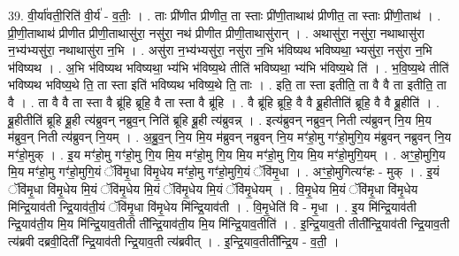 \documentclass[17pt]{extarticle}
\begin{document}
39. वी॒र्या॑वती॒रिति॑ वी॒र्य॑ - व॒तीः॒ । . ताः प्री॑णीत प्रीणीत॒ ता स्ताः प्री॑णी॒ताथाथ॑ प्रीणीत॒ ता स्ताः प्री॑णी॒ताथ॑ । . प्री॒णी॒ताथाथ॑ प्रीणीत प्रीणी॒ताथासु॑रा॒ नसु॑रा॒ नथ॑ प्रीणीत प्रीणी॒ताथासु॑रान् । . अथासु॑रा॒ नसु॑रा॒ नथाथासु॑रा न॒भ्य॑भ्यसु॑रा॒ नथाथासु॑रा न॒भि । . असु॑रा न॒भ्य॑भ्यसु॑रा॒ नसु॑रा न॒भि भ॑विष्यथ भविष्यथा॒ भ्यसु॑रा॒ नसु॑रा न॒भि भ॑विष्यथ । . अ॒भि भ॑विष्यथ भविष्यथा॒ भ्य॑भि भ॑विष्य॒थे तीति॑ भविष्यथा॒ भ्य॑भि भ॑विष्य॒थे ति॑ । . भ॒वि॒ष्य॒थे तीति॑ भविष्यथ भविष्य॒थे ति॒ ता स्ता इति॑ भविष्यथ भविष्य॒थे ति॒ ताः । . इति॒ ता स्ता इतीति॒ ता वै वै ता इतीति॒ ता वै । . ता वै वै ता स्ता वै ब्रू॑हि ब्रूहि॒ वै ता स्ता वै ब्रू॑हि । . वै ब्रू॑हि ब्रूहि॒ वै वै ब्रू॒हीतीति॑ ब्रूहि॒ वै वै ब्रू॒हीति॑ । . ब्रू॒हीतीति॑ ब्रूहि ब्रू॒ही त्य॑ब्रुवन् नब्रुव॒न् निति॑ ब्रूहि ब्रू॒ही त्य॑ब्रुवन्न् । . इत्य॑ब्रुवन् नब्रुव॒न् निती त्य॑ब्रुवन् नि॒य मि॒य म॑ब्रुव॒न् निती त्य॑ब्रुवन् नि॒यम् । . अ॒ब्रु॒व॒न् नि॒य मि॒य म॑ब्रुवन् नब्रुवन् नि॒य मꣳ॑हो॒मु गꣳ॑हो॒मुगि॒य म॑ब्रुवन् नब्रुवन् नि॒य मꣳ॑हो॒मुक् । . इ॒य मꣳ॑हो॒मु गꣳ॑हो॒मु गि॒य मि॒य मꣳ॑हो॒मु गि॒य मि॒य मꣳ॑हो॒मु गि॒य मि॒य मꣳ॑हो॒मुगि॒यम् । . अꣳ॒॒हो॒मुगि॒य मि॒य मꣳ॑हो॒मु गꣳ॑हो॒मुगि॒यं ॅवि॑मृ॒धा वि॑मृ॒धेय मꣳ॑हो॒मु गꣳ॑हो॒मुगि॒यं ॅवि॑मृ॒धा । . अꣳ॒॒हो॒मुगित्यꣳ॑हः - मुक् । . इ॒यं ॅवि॑मृ॒धा वि॑मृ॒धेय मि॒यं ॅवि॑मृ॒धेय मि॒यं ॅवि॑मृ॒धेय मि॒यं ॅवि॑मृ॒धेयम् । . वि॒मृ॒धेय मि॒यं ॅवि॑मृ॒धा वि॑मृ॒धेय मि॑न्द्रि॒याव॑ती न्द्रि॒याव॑ती॒यं ॅवि॑मृ॒धा वि॑मृ॒धेय मि॑न्द्रि॒याव॑ती । . वि॒मृ॒धेति॑ वि - मृ॒धा । . इ॒य मि॑न्द्रि॒याव॑ती न्द्रि॒याव॑ती॒य मि॒य मि॑न्द्रि॒याव॒तीती ती᳚न्द्रि॒याव॑ती॒य मि॒य मि॑न्द्रि॒याव॒तीति॑ । . इ॒न्द्रि॒याव॒ती तीती᳚न्द्रि॒याव॑ती न्द्रि॒याव॒ती त्य॑ब्रवी दब्रवी॒दिती᳚ न्द्रि॒याव॑ती न्द्रि॒याव॒ती त्य॑ब्रवीत् । . इ॒न्द्रि॒याव॒तीती᳚न्द्रि॒य - व॒ती॒ । \newline
\pagebreak
{}
\end{document}
